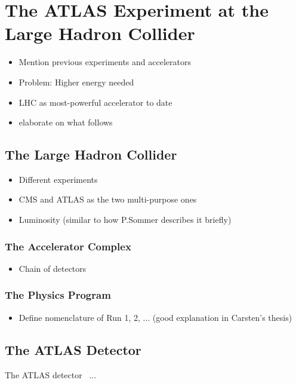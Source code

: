 
\chapter{The ATLAS Experiment at the Large Hadron Collider}
\label{chap:experiment}

\begin{itemize}
    \item Mention previous experiments and accelerators
    \item Problem: Higher energy needed
    \item LHC as most-powerful accelerator to date
    \item elaborate on what follows
\end{itemize}

\section{The Large Hadron Collider}

\begin{itemize}
    \item Different experiments
    \item CMS and ATLAS as the two multi-purpose ones
    \item Luminosity (similar to how P.Sommer describes it briefly)
\end{itemize}

\subsection{The Accelerator Complex}
\begin{itemize}
    \item Chain of detectors
\end{itemize}

\subsection{The Physics Program}
\begin{itemize}
    \item Define nomenclature of Run 1, 2, ... (good explanation in Carsten's thesis)
\end{itemize}


\section{The ATLAS Detector}
The ATLAS detector~\cite{PERF-2007-01} ...

